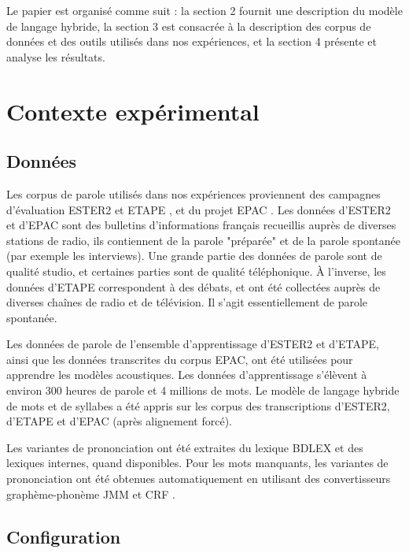 \documentclass[10pt,a4paper,twoside]{article}
\begin{document}
Le papier est organisé comme suit : la section 2 fournit une description du modèle de langage hybride, la section 3 est consacrée à la description des corpus de données et des outils utilisés dans nos expériences, et la section 4 présente et analyse les résultats.




\section{Contexte expérimental}

\subsection{Données}

Les corpus de parole utilisés dans nos expériences proviennent des campagnes d'évaluation ESTER2 \cite{Galliano2009} et ETAPE \cite{Gravier2012}, et du projet EPAC \cite{ESTEVE2010}.
Les données d'ESTER2 et d'EPAC sont des bulletins d'informations français recueillis auprès de diverses stations de radio, ils contiennent de la parole "préparée" et de la parole spontanée (par exemple les interviews). 
Une grande partie des données de parole sont de qualité studio, et certaines parties sont de qualité téléphonique. 
À l'inverse, les données d'ETAPE correspondent à des débats, et ont été collectées auprès de diverses chaînes de radio et de télévision. Il s'agit essentiellement de parole spontanée.

Les données de parole de l'ensemble d'apprentissage d'ESTER2 et d'ETAPE, ainsi que les données transcrites du corpus EPAC, ont été utilisées pour apprendre les modèles acoustiques. Les données d'apprentissage s'élèvent à environ 300 heures de parole et 4 millions de mots. Le modèle de langage hybride de mots et de syllabes a été appris sur les corpus des transcriptions d'ESTER2, d'ETAPE et d'EPAC (après alignement forcé).

Les variantes de prononciation ont été extraites du lexique BDLEX \cite{Calmes1998} et des lexiques internes, quand disponibles. Pour les mots manquants, les variantes de prononciation ont été obtenues automatiquement en utilisant des convertisseurs graphème-phonème JMM et CRF \cite{Illina2011}.


\subsection{Configuration}
\end{document}

